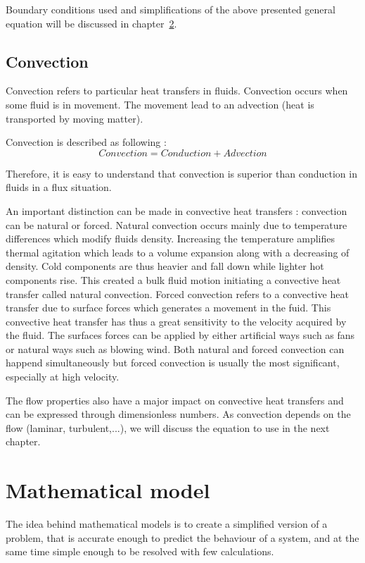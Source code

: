 \documentclass{report}
\begin{document}
	Boundary conditions used and simplifications of the above presented general equation will be discussed in chapter~\ref{mm}.
		
	\section{Convection}\label{cv}
	
	Convection refers to particular heat transfers in fluids. Convection occurs when some fluid is in movement. The movement lead to an advection (heat is transported by moving matter).
	
	Convection is described as following :
	\begin{equation}
		Convection = Conduction + Advection
	\end{equation}
	
	Therefore, it is easy to understand that convection is superior than conduction in fluids in a flux situation. 
	
	An important distinction can be made in convective heat transfers : convection can be natural or forced.
	Natural convection occurs mainly due to temperature differences which modify fluids density. Increasing the temperature amplifies thermal agitation which leads to a volume expansion along with a decreasing of density. Cold components are thus heavier and fall down while lighter hot components rise. This created a bulk fluid motion initiating a convective heat transfer called natural convection.
	Forced convection refers to a convective heat transfer due to surface forces which generates a movement in the fuid. This convective heat transfer has thus a great sensitivity to the velocity acquired by the fluid. The surfaces forces can be applied by either artificial ways such as fans or natural ways such as blowing wind. 
	Both natural and forced convection can happend simultaneously but forced convection is usually the most significant, especially at high velocity.
	
	The flow properties also have a major impact on convective heat transfers and can be expressed through dimensionless numbers.
	As convection depends on the flow (laminar, turbulent,...), we will discuss the equation to use in the next chapter.
	
	\chapter{Mathematical model}\label{mm}
	
	The idea behind mathematical models is to create a simplified version of a problem, that is accurate enough to predict the behaviour of a system, and at the same time simple enough to be resolved with few calculations.
	
\end{document}
